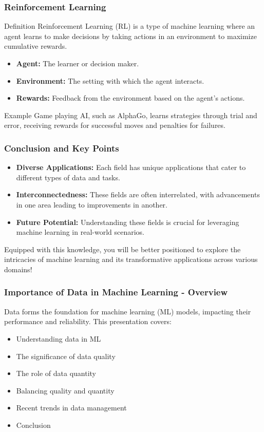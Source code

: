 \documentclass[aspectratio=169]{beamer}
\begin{document}
\begin{frame}[fragile]
    \frametitle{Reinforcement Learning}
    \begin{block}{Definition}
        Reinforcement Learning (RL) is a type of machine learning where an agent learns to make decisions by taking actions in an environment 
        to maximize cumulative rewards.
    \end{block}

    \begin{itemize}
        \item \textbf{Agent:} The learner or decision maker.
        \item \textbf{Environment:} The setting with which the agent interacts.
        \item \textbf{Rewards:} Feedback from the environment based on the agent's actions.
    \end{itemize}

    \begin{block}{Example}
        Game playing AI, such as AlphaGo, learns strategies through trial and error, receiving rewards for successful moves and 
        penalties for failures.
    \end{block}
\end{frame}

\begin{frame}[fragile]
    \frametitle{Conclusion and Key Points}
    \begin{itemize}
        \item \textbf{Diverse Applications:} Each field has unique applications that cater to different types of data and tasks.
        \item \textbf{Interconnectedness:} These fields are often interrelated, with advancements in one area leading to improvements in another.
        \item \textbf{Future Potential:} Understanding these fields is crucial for leveraging machine learning in real-world scenarios.
    \end{itemize}

    Equipped with this knowledge, you will be better positioned to explore the intricacies of machine learning 
    and its transformative applications across various domains!
\end{frame}

\begin{frame}[fragile]
    \frametitle{Importance of Data in Machine Learning - Overview}
    Data forms the foundation for machine learning (ML) models, impacting their performance and reliability. 
    This presentation covers:
    \begin{itemize}
        \item Understanding data in ML
        \item The significance of data quality
        \item The role of data quantity
        \item Balancing quality and quantity
        \item Recent trends in data management
        \item Conclusion
    \end{itemize}
\end{frame}
\end{document}
